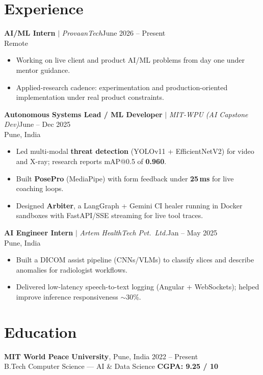 \documentclass[a4paper,10pt]{article}
\newcommand{\role}[4]{%
  \noindent\textbf{#1} $|$ \textit{#2}\hfill #3\\[1pt]
  {\small #4}\par\vspace{2pt}%
}
\begin{document}
\section*{Experience}
\role{AI/ML Intern}{ProvaanTech}{June 2026 -- Present}{Remote}
\begin{itemize}
  \item Working on live client and product AI/ML problems from day one under mentor guidance.
  \item Applied-research cadence: experimentation and production-oriented implementation under real product constraints.
\end{itemize}

\vspace{6pt}
\role{Autonomous Systems Lead / ML Developer}{MIT-WPU (AI Capstone Dev)}{June -- Dec 2025}{Pune, India}
\begin{itemize}
  \item Led multi-modal \textbf{threat detection} (YOLOv11 + EfficientNetV2) for video and X-ray; research reports mAP@0.5 of \textbf{0.960}.
  \item Built \textbf{PosePro} (MediaPipe) with form feedback under \textbf{25\,ms} for live coaching loops.
  \item Designed \textbf{Arbiter}, a LangGraph + Gemini CI healer running in Docker sandboxes with FastAPI/SSE streaming for live tool traces.
\end{itemize}

\vspace{6pt}
\role{AI Engineer Intern}{Artem HealthTech Pvt.\ Ltd.}{Jan -- May 2025}{Pune, India}
\begin{itemize}
  \item Built a DICOM assist pipeline (CNNs/VLMs) to classify slices and describe anomalies for radiologist workflows.
  \item Delivered low-latency speech-to-text logging (Angular + WebSockets); helped improve inference responsiveness $\sim$30\%.
\end{itemize}

\section*{Education}
\noindent
\textbf{MIT World Peace University}, Pune, India \hfill 2022 -- Present\\[2pt]
B.Tech Computer Science --- AI \& Data Science \hfill {\large\bfseries CGPA: 9.25 / 10}
\end{document}
